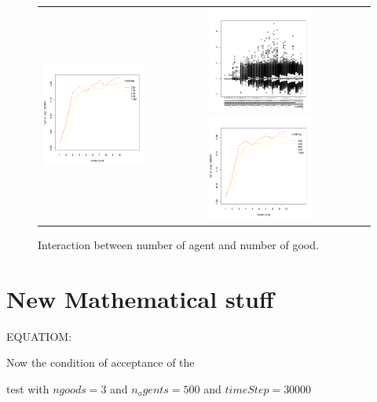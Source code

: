 \documentclass[a4paper]{article}
\begin{document}
\begin{figure}[htp]
\begin{tabular}{cc}
	\includegraphics[width=3.5cm]{interactionNGoodNAgentSD.pdf} &
	\includegraphics[width=3.5cm]{interactionNGoodNAgent.pdf}
	\includegraphics[width=3.5cm]{interactionNGoodNAgentSD.pdf} 
    \end{tabular}
    \caption{Interaction between number of agent and number of good.}
\end{figure}

\section{New Mathematical stuff}

EQUATIOM: %

Now the condition of acceptance of the 

test with $ngoods=3$ and $n_agents=500$ and $timeStep=30000$
\end{document}
